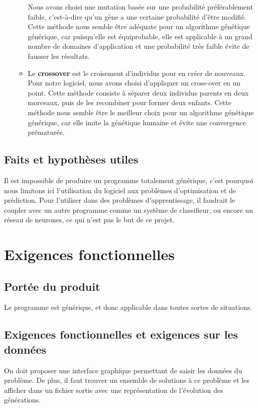 \documentclass[a4paper,11pt]{article}
\begin{document}
\begin{itemize}
\begin{itemize}
				Nous avons choisi une mutation basée sur une probabilité préférablement faible, c'est-à-dire qu'un gène a une certaine probabilité d'être modifié. 
				Cette méthode nous semble être adéquate pour un algorithme génétique générique, car puisqu’elle est équiprobable, elle est applicable à un grand nombre de domaines d’application et une probabilité très faible 
				évite de fausser les résultats.
				\item Le \textbf{crossover} est le croisement d'individus pour en créer de nouveaux.
				Pour notre logiciel, nous avons choisi d’appliquer un cross-over en un point. 
				Cette méthode consiste à séparer deux individus parents en deux morceaux, puis de les recombiner pour former deux enfants.
				Cette méthode nous semble être le meilleur choix pour un algorithme génétique générique,
				car elle imite la génétique humaine et évite une convergence prématurée.
				
				

				

				
				\end{itemize}
			\end{itemize}
			
		\subsection{Faits et hypothèses utiles}
			Il est impossible de produire un programme totalement générique, c’est pourquoi nous limitons ici l’utilisation du logiciel aux problèmes d’optimisation et de prédiction. 
			Pour l’utiliser dans des problèmes d’apprentissage, il faudrait le coupler avec un autre programme comme un système de classifieur, ou encore un réseau de neurones, ce qui n’est pas le but de ce projet.
	\section{Exigences fonctionnelles}
		\subsection{Portée du produit}
			Le programme est générique, et donc applicable dans toutes sortes de situations.
		\subsection{Exigences fonctionnelles et exigences sur les données}
			On doit proposer une interface graphique permettant de saisir les données du problème. De plus, il faut trouver un ensemble de solutions à ce problème et les afficher dans un fichier sortie avec une représentation de l’évolution des générations.
			
\end{document}
